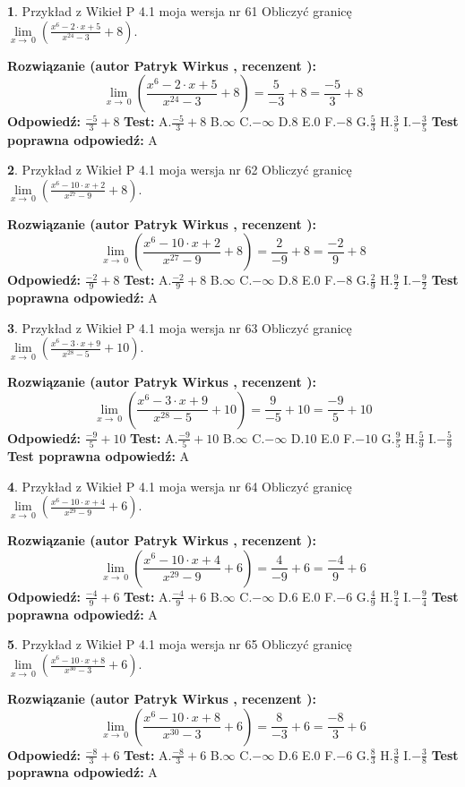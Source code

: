 \documentclass[12pt, a4paper]{article}
\theoremstyle{definition} %
\newtheorem{zad}{}
\newcommand{\zadStart}[1]{\begin{zad}#1\newline}
\newcommand{\zadStop}{\end{zad}}
\newcommand{\rozwStart}[2]{\noindent \textbf{Rozwiązanie (autor #1 , recenzent #2): }\newline}
\newcommand{\rozwStop}{\newline}
\newcommand{\odpStart}{\noindent \textbf{Odpowiedź:}\newline}
\newcommand{\odpStop}{\newline}
\newcommand{\testStart}{\noindent \textbf{Test:}\newline}
\newcommand{\testStop}{\newline}
\newcommand{\kluczStart}{\noindent \textbf{Test poprawna odpowiedź:}\newline}
\newcommand{\kluczStop}{\newline}
\begin{document}
\zadStart{Przykład z Wikieł P 4.1 moja wersja nr 61}
Obliczyć granicę $\lim\limits_{x\to\ 0}(\frac{x^{6}-2 \cdot x +5}{x^{24}-3}+8)$.
\zadStop
\rozwStart{Patryk Wirkus}{}
$$\lim\limits_{x\to\ 0}(\frac{x^{6}-2 \cdot x +5}{x^{24}-3}+8)=\frac{5}{-3}+8=\frac{-5}{3}+8$$
\rozwStop
\odpStart
$\frac{-5}{3}+8$
\odpStop
\testStart
A.$\frac{-5}{3}+8$
B.$\infty$
C.$-\infty$
D.$8$
E.$0$
F.$-8$
G.$\frac{5}{3}$
H.$\frac{3}{5}$
I.$-\frac{3}{5}$
\testStop
\kluczStart
A
\kluczStop



\zadStart{Przykład z Wikieł P 4.1 moja wersja nr 62}
Obliczyć granicę $\lim\limits_{x\to\ 0}(\frac{x^{6}-10 \cdot x +2}{x^{27}-9}+8)$.
\zadStop
\rozwStart{Patryk Wirkus}{}
$$\lim\limits_{x\to\ 0}(\frac{x^{6}-10 \cdot x +2}{x^{27}-9}+8)=\frac{2}{-9}+8=\frac{-2}{9}+8$$
\rozwStop
\odpStart
$\frac{-2}{9}+8$
\odpStop
\testStart
A.$\frac{-2}{9}+8$
B.$\infty$
C.$-\infty$
D.$8$
E.$0$
F.$-8$
G.$\frac{2}{9}$
H.$\frac{9}{2}$
I.$-\frac{9}{2}$
\testStop
\kluczStart
A
\kluczStop



\zadStart{Przykład z Wikieł P 4.1 moja wersja nr 63}
Obliczyć granicę $\lim\limits_{x\to\ 0}(\frac{x^{6}-3 \cdot x +9}{x^{28}-5}+10)$.
\zadStop
\rozwStart{Patryk Wirkus}{}
$$\lim\limits_{x\to\ 0}(\frac{x^{6}-3 \cdot x +9}{x^{28}-5}+10)=\frac{9}{-5}+10=\frac{-9}{5}+10$$
\rozwStop
\odpStart
$\frac{-9}{5}+10$
\odpStop
\testStart
A.$\frac{-9}{5}+10$
B.$\infty$
C.$-\infty$
D.$10$
E.$0$
F.$-10$
G.$\frac{9}{5}$
H.$\frac{5}{9}$
I.$-\frac{5}{9}$
\testStop
\kluczStart
A
\kluczStop



\zadStart{Przykład z Wikieł P 4.1 moja wersja nr 64}
Obliczyć granicę $\lim\limits_{x\to\ 0}(\frac{x^{6}-10 \cdot x +4}{x^{29}-9}+6)$.
\zadStop
\rozwStart{Patryk Wirkus}{}
$$\lim\limits_{x\to\ 0}(\frac{x^{6}-10 \cdot x +4}{x^{29}-9}+6)=\frac{4}{-9}+6=\frac{-4}{9}+6$$
\rozwStop
\odpStart
$\frac{-4}{9}+6$
\odpStop
\testStart
A.$\frac{-4}{9}+6$
B.$\infty$
C.$-\infty$
D.$6$
E.$0$
F.$-6$
G.$\frac{4}{9}$
H.$\frac{9}{4}$
I.$-\frac{9}{4}$
\testStop
\kluczStart
A
\kluczStop



\zadStart{Przykład z Wikieł P 4.1 moja wersja nr 65}
Obliczyć granicę $\lim\limits_{x\to\ 0}(\frac{x^{6}-10 \cdot x +8}{x^{30}-3}+6)$.
\zadStop
\rozwStart{Patryk Wirkus}{}
$$\lim\limits_{x\to\ 0}(\frac{x^{6}-10 \cdot x +8}{x^{30}-3}+6)=\frac{8}{-3}+6=\frac{-8}{3}+6$$
\rozwStop
\odpStart
$\frac{-8}{3}+6$
\odpStop
\testStart
A.$\frac{-8}{3}+6$
B.$\infty$
C.$-\infty$
D.$6$
E.$0$
F.$-6$
G.$\frac{8}{3}$
H.$\frac{3}{8}$
I.$-\frac{3}{8}$
\testStop
\kluczStart
A
\kluczStop
\end{document}

